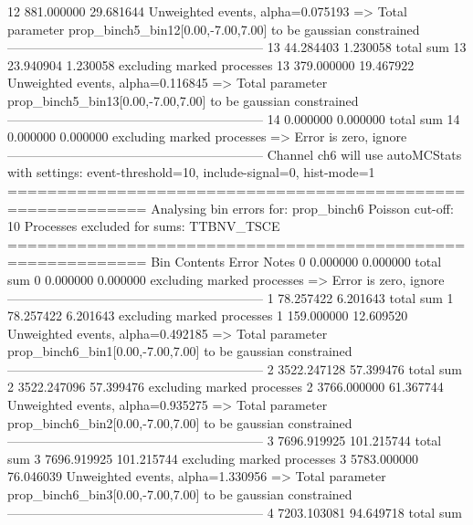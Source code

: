 12         881.000000      29.681644       Unweighted events, alpha=0.075193
  => Total parameter prop_binch5_bin12[0.00,-7.00,7.00] to be gaussian constrained
------------------------------------------------------------
13         44.284403       1.230058        total sum                     
13         23.940904       1.230058        excluding marked processes    
13         379.000000      19.467922       Unweighted events, alpha=0.116845
  => Total parameter prop_binch5_bin13[0.00,-7.00,7.00] to be gaussian constrained
------------------------------------------------------------
14         0.000000        0.000000        total sum                     
14         0.000000        0.000000        excluding marked processes    
  => Error is zero, ignore      
------------------------------------------------------------
Channel ch6 will use autoMCStats with settings: event-threshold=10, include-signal=0, hist-mode=1
============================================================
Analysing bin errors for: prop_binch6
Poisson cut-off: 10
Processes excluded for sums: TTBNV_TSCE
============================================================
Bin        Contents        Error           Notes                         
0          0.000000        0.000000        total sum                     
0          0.000000        0.000000        excluding marked processes    
  => Error is zero, ignore      
------------------------------------------------------------
1          78.257422       6.201643        total sum                     
1          78.257422       6.201643        excluding marked processes    
1          159.000000      12.609520       Unweighted events, alpha=0.492185
  => Total parameter prop_binch6_bin1[0.00,-7.00,7.00] to be gaussian constrained
------------------------------------------------------------
2          3522.247128     57.399476       total sum                     
2          3522.247096     57.399476       excluding marked processes    
2          3766.000000     61.367744       Unweighted events, alpha=0.935275
  => Total parameter prop_binch6_bin2[0.00,-7.00,7.00] to be gaussian constrained
------------------------------------------------------------
3          7696.919925     101.215744      total sum                     
3          7696.919925     101.215744      excluding marked processes    
3          5783.000000     76.046039       Unweighted events, alpha=1.330956
  => Total parameter prop_binch6_bin3[0.00,-7.00,7.00] to be gaussian constrained
------------------------------------------------------------
4          7203.103081     94.649718       total sum                     
